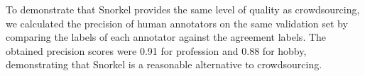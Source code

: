 To demonstrate that Snorkel provides the same level of quality as crowdsourcing,
we calculated the precision of human annotators
on the same validation set by comparing
the labels of each annotator against the agreement
labels. The obtained precision scores were 0.91 for
profession and 0.88 for hobby, demonstrating that
Snorkel is a reasonable alternative to crowdsourcing.

